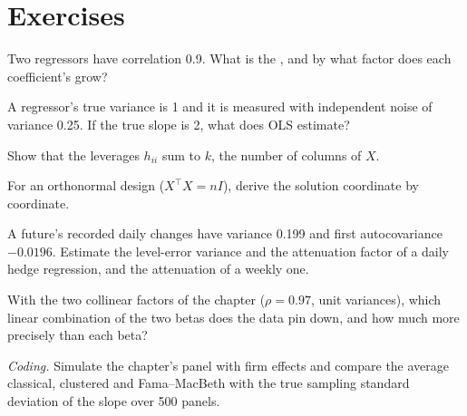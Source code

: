 \section{Exercises}

\begin{exercise}[$\star$]\label{exo:qm:linear-models-under-stress:1}
Two regressors have correlation 0.9. What is the , and by what factor does each coefficient's  grow?
\end{exercise}

\begin{exercise}[$\star$]\label{exo:qm:linear-models-under-stress:2}
A regressor's true variance is 1 and it is measured with independent noise of variance 0.25. If the true slope is 2, what does OLS estimate?
\end{exercise}

\begin{exercise}[$\star$]\label{exo:qm:linear-models-under-stress:3}
Show that the leverages $h_{ii}$ sum to $k$, the number of columns of $X$.
\end{exercise}

\begin{exercise}[$\star\star$]\label{exo:qm:linear-models-under-stress:4}
For an orthonormal design ($X^\top X = nI$), derive the  solution coordinate by coordinate.
\end{exercise}

\begin{exercise}[$\star\star$]\label{exo:qm:linear-models-under-stress:5}
A future's recorded daily changes have variance 0.199 and first autocovariance $-0.0196$. Estimate the level-error variance and the attenuation
factor of a daily hedge regression, and the attenuation of a weekly one.
\end{exercise}

\begin{exercise}[$\star\star$]\label{exo:qm:linear-models-under-stress:6}
With the two collinear factors of the chapter ($\rho = 0.97$, unit variances), which linear combination of the two betas does the data pin down,
and how much more precisely than each beta?
\end{exercise}

\begin{exercise}[$\star\star\star$]\label{exo:qm:linear-models-under-stress:7}
\emph{Coding.} Simulate the chapter's panel with firm effects and compare the average classical, clustered and Fama--MacBeth  with
the true sampling standard deviation of the slope over 500 panels.
\end{exercise}

